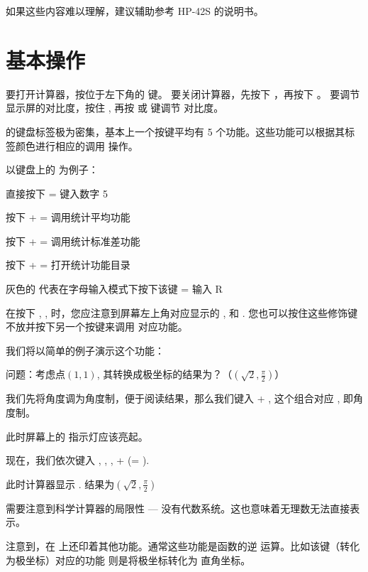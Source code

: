如果这些内容难以理解，建议辅助参考 HP-42S 的说明书。

\label{section:basic_ops}
\section{基本操作}

要打开计算器，按位于左下角的  键。
要关闭计算器，先按下 \keyH ，再按下 。
要调节显示屏的对比度，按住 , 再按 \calckey{+} 或 \calckey{-} 键调节
对比度。

\wpx 的键盘标签极为密集，基本上一个按键平均有 5 个功能。这些功能可以根据其标签颜色进行相应的调用
操作。

以键盘上的  为例子：

\ol
\item 直接按下  = 键入数字 5
\item 按下 \keyF +  = 调用统计平均功能 
\item 按下 \keyG +  = 调用统计标准差功能 
\item 按下 \keyH +  = 打开统计功能目录 
\item 灰色的  代表在字母输入模式下按下该键 = 输入 R
\olx

在按下 \keyF, \keyG, \keyH 时，您应注意到屏幕左上角对应显示的 , 
 和 . 您也可以按住这些修饰键不放并按下另一个按键来调用
对应功能。

我们将以简单的例子演示这个功能：

问题：考虑点$(1,1)$, 其转换成极坐标的结果为？（$(\sqrt{2}, \frac{\pi}{2})$）

我们先将角度调为角度制，便于阅读结果，那么我们键入 \keyG + , 这个组合对应 
, 即角度制。

此时屏幕上的 \seg{\inddeg} 指示灯应该亮起。

现在，我们依次键入 , , , \keyG + 
\calckey{$\rightarrow$} (= ).

此时计算器显示 . 
结果为$(\sqrt{2}, \frac{\pi}{2})$

需要注意到科学计算器的局限性 --- 没有代数系统。这也意味着无理数无法直接表示。

注意到，在  上还印着其他功能。通常这些功能是函数的逆
运算。比如该键（转化为极坐标）对应的功能  则是将极坐标转化为
直角坐标。
